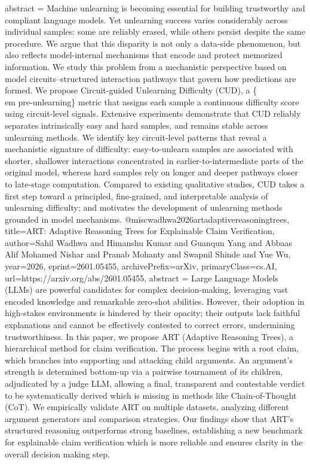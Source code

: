 {      abstract = {Machine unlearning is becoming essential for building trustworthy and compliant language models. Yet unlearning success varies considerably across individual samples: some are reliably erased, while others persist despite the same procedure. We argue that this disparity is not only a data-side phenomenon, but also reflects model-internal mechanisms that encode and protect memorized information. We study this problem from a mechanistic perspective based on model circuits--structured interaction pathways that govern how predictions are formed. We propose Circuit-guided Unlearning Difficulty (CUD), a \{\\em pre-unlearning\} metric that assigns each sample a continuous difficulty score using circuit-level signals. Extensive experiments demonstrate that CUD reliably separates intrinsically easy and hard samples, and remains stable across unlearning methods. We identify key circuit-level patterns that reveal a mechanistic signature of difficulty: easy-to-unlearn samples are associated with shorter, shallower interactions concentrated in earlier-to-intermediate parts of the original model, whereas hard samples rely on longer and deeper pathways closer to late-stage computation. Compared to existing qualitative studies, CUD takes a first step toward a principled, fine-grained, and interpretable analysis of unlearning difficulty; and motivates the development of unlearning methods grounded in model mechanisms.}
}@misc{wadhwa2026artadaptivereasoningtrees,
      title={ART: Adaptive Reasoning Trees for Explainable Claim Verification}, 
      author={Sahil Wadhwa and Himanshu Kumar and Guanqun Yang and Abbaas Alif Mohamed Nishar and Pranab Mohanty and Swapnil Shinde and Yue Wu},
      year={2026},
      eprint={2601.05455},
      archivePrefix={arXiv},
      primaryClass={cs.AI},
      url={https://arxiv.org/abs/2601.05455},
      abstract = {Large Language Models (LLMs) are powerful candidates for complex decision-making, leveraging vast encoded knowledge and remarkable zero-shot abilities. However, their adoption in high-stakes environments is hindered by their opacity; their outputs lack faithful explanations and cannot be effectively contested to correct errors, undermining trustworthiness. In this paper, we propose ART (Adaptive Reasoning Trees), a hierarchical method for claim verification. The process begins with a root claim, which branches into supporting and attacking child arguments. An argument's strength is determined bottom-up via a pairwise tournament of its children, adjudicated by a judge LLM, allowing a final, transparent and contestable verdict to be systematically derived which is missing in methods like Chain-of-Thought (CoT). We empirically validate ART on multiple datasets, analyzing different argument generators and comparison strategies. Our findings show that ART's structured reasoning outperforms strong baselines, establishing a new benchmark for explainable claim verification which is more reliable and ensures clarity in the overall decision making step.}
}
